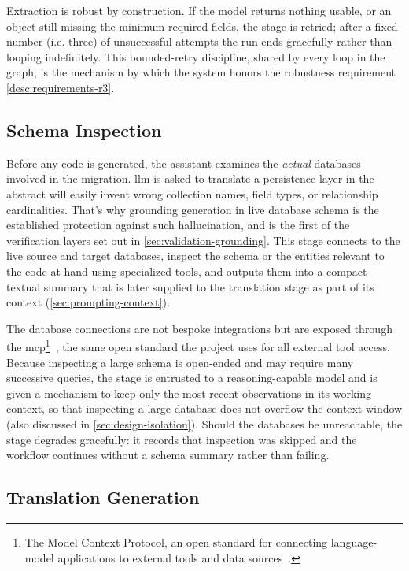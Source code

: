 Extraction is robust by construction. If the model returns nothing usable, or an object still missing the minimum required fields, the stage is retried; after a fixed number (i.e. three) of unsuccessful attempts the run ends gracefully rather than looping indefinitely. This bounded-retry discipline, shared by every loop in the graph, is the mechanism by which the system honors the robustness requirement \ref{desc:requirements-r3}.

\subsection{Schema Inspection}
\label{sec:workflow-inspect}

Before any code is generated, the assistant examines the \emph{actual} databases involved in the migration. \Acrshort{llm} is asked to translate a persistence layer in the abstract will easily invent wrong collection names, field types, or relationship cardinalities. That's why grounding generation in live database schema is the established protection against such hallucination, and is the first of the verification layers set out in \cref{sec:validation-grounding}. This stage connects to the live source and target databases, inspect the schema or the entities relevant to the code at hand using specialized tools, and outputs them into a compact textual summary that is later supplied to the translation stage as part of its context (\cref{sec:prompting-context}).

The database connections are not bespoke integrations but are exposed through the \Acrfull{mcp}\footnote{The Model Context Protocol, an open standard for connecting language-model applications to external tools and data sources~\cite{modelContextProtocol2024}.}~\cite{modelContextProtocol2024}, the same open standard the project uses for all external tool access. Because inspecting a large schema is open-ended and may require many successive queries, the stage is entrusted to a reasoning-capable model and is given a mechanism to keep only the most recent observations in its working context, so that inspecting a large database does not overflow the context window (also discussed in \cref{sec:design-isolation}). Should the databases be unreachable, the stage degrades gracefully: it records that inspection was skipped and the workflow continues without a schema summary rather than failing.

\subsection{Translation Generation}
\label{sec:workflow-generate}

